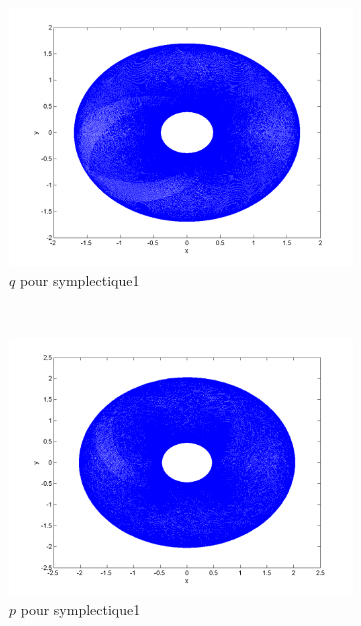 \begin{figure}[!ht]
  \centering
  \begin{subfigure}[b]{0.3\textwidth}
    \includegraphics[width=\textwidth]{images/Q1_symplectique1_q.png}
    \caption{$q$ pour symplectique1}
    \label{fig:q1_symplectique1_q}
  \end{subfigure}%
  ~
  \begin{subfigure}[b]{0.3\textwidth}
    \includegraphics[width=\textwidth]{images/Q1_symplectique1_p.png}
    \caption{$p$ pour symplectique1}
    \label{fig:q1_symplectique1_p}
  \end{subfigure}
  ~
  \begin{subfigure}[b]{0.3\textwidth}

\end{subfigure}
\end{figure}
